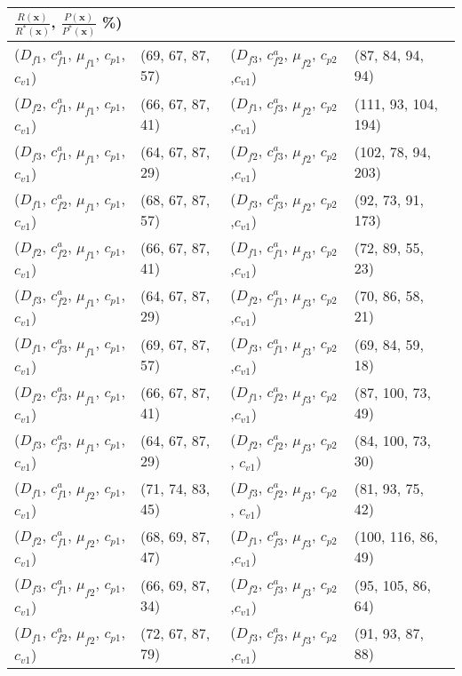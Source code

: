 \documentclass[preprint,12pt]{elsarticle}
\begin{document}
\begin{appendices}
\begin{table}[htbp]
\begin{tabular}{llll}
    $\frac{R(\boldsymbol{x})}{R^{*}(\boldsymbol{x})}$, $\frac{P(\boldsymbol{x})}{P^{*}(\boldsymbol{x})}$ \%) \\
    \midrule
    ($D_{f1}$, $c^{a}_{f1}$, $\mu_{f1}$, $c_{p1}$, $c_{v1}$) & (69, 67, 87, 57) & ($D_{f3}$, $c^{a}_{f2}$, $\mu_{f2}$, $c_{p2}$,$c_{v1}$) & (87, 84, 94, 94) \\
    ($D_{f2}$, $c^{a}_{f1}$, $\mu_{f1}$, $c_{p1}$, $c_{v1}$) & (66, 67, 87, 41) & ($D_{f1}$, $c^{a}_{f3}$, $\mu_{f2}$, $c_{p2}$,$c_{v1}$) & (111, 93, 104, 194) \\
    ($D_{f3}$, $c^{a}_{f1}$, $\mu_{f1}$, $c_{p1}$, $c_{v1}$) & (64, 67, 87, 29) & ($D_{f2}$, $c^{a}_{f3}$, $\mu_{f2}$, $c_{p2}$,$c_{v1}$) & (102, 78, 94, 203) \\
    ($D_{f1}$, $c^{a}_{f2}$, $\mu_{f1}$, $c_{p1}$, $c_{v1}$) & (68, 67, 87, 57) & ($D_{f3}$, $c^{a}_{f3}$, $\mu_{f2}$, $c_{p2}$,$c_{v1}$) & (92, 73, 91, 173) \\
    ($D_{f2}$, $c^{a}_{f2}$, $\mu_{f1}$, $c_{p1}$, $c_{v1}$) & (66, 67, 87, 41) & ($D_{f1}$, $c^{a}_{f1}$, $\mu_{f3}$, $c_{p2}$,$c_{v1}$) & (72, 89, 55, 23) \\
    ($D_{f3}$, $c^{a}_{f2}$, $\mu_{f1}$, $c_{p1}$, $c_{v1}$) & (64, 67, 87, 29) & ($D_{f2}$, $c^{a}_{f1}$, $\mu_{f3}$, $c_{p2}$,$c_{v1}$) & (70, 86, 58, 21) \\
    ($D_{f1}$, $c^{a}_{f3}$, $\mu_{f1}$, $c_{p1}$, $c_{v1}$) & (69, 67, 87, 57) & ($D_{f3}$, $c^{a}_{f1}$, $\mu_{f3}$, $c_{p2}$,$c_{v1}$) & (69, 84, 59, 18) \\
    ($D_{f2}$, $c^{a}_{f3}$, $\mu_{f1}$, $c_{p1}$, $c_{v1}$) & (66, 67, 87, 41) & ($D_{f1}$, $c^{a}_{f2}$, $\mu_{f3}$, $c_{p2}$,$c_{v1}$) & (87, 100, 73, 49) \\
    ($D_{f3}$, $c^{a}_{f3}$, $\mu_{f1}$, $c_{p1}$, $c_{v1}$) & (64, 67, 87, 29) & ($D_{f2}$, $c^{a}_{f2}$, $\mu_{f3}$, $c_{p2}$, $c_{v1})$ & (84, 100, 73, 30) \\
    ($D_{f1}$, $c^{a}_{f1}$, $\mu_{f2}$, $c_{p1}$, $c_{v1}$)& (71, 74, 83, 45) & ($D_{f3}$, $c^{a}_{f2}$, $\mu_{f3}$, $c_{p2}$, $c_{v1}$) & (81, 93, 75, 42) \\
    ($D_{f2}$, $c^{a}_{f1}$, $\mu_{f2}$, $c_{p1}$, $c_{v1}$) & (68, 69, 87, 47) & ($D_{f1}$, $c^{a}_{f3}$, $\mu_{f3}$, $c_{p2}$,$c_{v1}$) & (100, 116, 86, 49) \\
    ($D_{f3}$, $c^{a}_{f1}$, $\mu_{f2}$, $c_{p1}$, $c_{v1}$)& (66, 69, 87, 34) & ($D_{f2}$, $c^{a}_{f3}$, $\mu_{f3}$, $c_{p2}$,$c_{v1}$) & (95, 105, 86, 64) \\
     ($D_{f1}$, $c^{a}_{f2}$, $\mu_{f2}$, $c_{p1}$, $c_{v1}$) & (72, 67, 87, 79) & ($D_{f3}$, $c^{a}_{f3}$, $\mu_{f3}$, $c_{p2}$,$c_{v1}$) & (91, 93, 87, 88) \\

\end{tabular}
\end{table}
\end{appendices}
\end{document}
